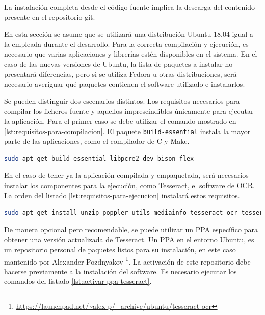 La instalación completa desde el código fuente implica la descarga del contenido presente en el repositorio git.

En esta sección se asume que se utilizará una distribución Ubuntu 18.04 igual a la empleada durante el desarrollo. Para la correcta compilación y ejecución, es necesario que varias aplicaciones y librerías estén disponibles en el sistema. En el caso de las nuevas versiones de Ubuntu, la lista de paquetes a instalar no presentará diferencias, pero si se utiliza Fedora u otras distribuciones, será necesario averiguar qué paquetes contienen el software utilizado e instalarlos.

Se pueden distinguir dos escenarios distintos. Los requisitos necesarios para compilar los ficheros fuente y aquellos imprescindibles únicamente para ejecutar la aplicación. Para el primer caso se debe utilizar el comando mostrado en \ref{lst:requisitos-para-compilacion}. El paquete \verb|build-essential| instala la mayor parte de las aplicaciones, como el compilador de C y Make.

\begin{lstlisting}[language=bash,caption={Dependencias para la compilación},label=lst:requisitos-para-compilacion]
sudo apt-get build-essential libpcre2-dev bison flex
\end{lstlisting}

En el caso de tener ya la aplicación compilada y empaquetada, será necesarios instalar los componentes para la ejecución, como Tesseract, el software de OCR. La orden del listado \ref{lst:requisitos-para-ejecucion} instalará estos requisitos.

\begin{lstlisting}[language=bash,caption={Dependencias para la ejecución},label=lst:requisitos-para-ejecucion]
sudo apt-get install unzip poppler-utils mediainfo tesseract-ocr tesseract-ocr-spa jq python3-opencv jq bc
\end{lstlisting}

De manera opcional pero recomendable, se puede utilizar un PPA específico para obtener una versión actualizada de Tesseract. Un PPA en el entorno Ubuntu, es un repositorio personal de paquetes listos para su instalación, en este caso mantenido por Alexander Pozdnyakov \footnote{\url{https://launchpad.net/~alex-p/+archive/ubuntu/tesseract-ocr}}. La activación de este repositorio debe hacerse previamente a la instalación del software. Es necesario ejecutar los comandos del listado \ref{lst:activar-ppa-tesseract}.

